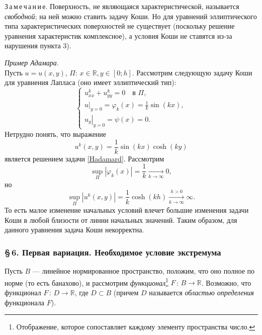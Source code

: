 \documentclass[12pt,a5paper]{book}
\begin{document}
	\noindent З\,а\,м\,е\,ч\,а\,н\,и\,е. Поверхность, не являющаяся характеристической, называется \emph{свободной}; на ней можно ставить задачу Коши. Но для уравнений эллиптического типа характеристических поверхностей не существует (поскольку решение уравнения характеристик комплексное), а условия Коши не ставятся из-за нарушения пункта 3).
	
	\vspace*{1em}
	\emph{Пример Адамара.}\\
	\noindent Пусть $u = u(x,y)$, $\Pi$: $x \in \mathbb{R}, y \in [0; h]$. Рассмотрим следующую задачу Коши для уравнения Лапласа (оно имеет эллиптический тип):
	\begin{equation}\label{Hadamard}
		\begin{cases}
			u^k_{xx} + u^k_{yy} = 0 \quad \text{в }\Pi, \\
			\left.u\right|_{y=0} = \varphi_k(x) = \frac{1}{k}\sin{(kx)}, \\ \left.u_y\right|_{y=0} = \psi(x) = 0.
		\end{cases}
	\end{equation}
	Нетрудно понять, что выражение
	\begin{equation*}
		u^k(x,y) = \frac{1}{k}\sin{(kx)}\cosh{(ky)}
	\end{equation*}
	является решением задачи \eqref{Hadamard}. Рассмотрим
	\begin{equation*}
		\sup_{\Pi}\left|\varphi_k(x)\right| = \frac{1}{k} \xrightarrow[k\rightarrow\infty]{} 0,
	\end{equation*}
	но
	\begin{equation*}
		\sup_{\Pi}\left|u^k(x,y)\right| = \frac{1}{k}\cosh{(kh)} \xrightarrow[k\rightarrow\infty]{h>0} \infty.
	\end{equation*}
	То есть малое изменение начальных условий влечет большие изменения задачи Коши в любой близости от линии начальных значений. Таким образом, для данного уравнения задача Коши некорректна.
	
	\subsubsection*{\S\,6. Первая вариация. Необходимое условие экстремума}
	
	Пусть $B$ --- линейное нормированное пространство, положим, что оно полное по норме (то есть банахово), и рассмотрим \emph{функционал}\footnote{Отображение, которое сопоставляет каждому элементу пространства число.} $F$\,: $B \rightarrow \mathbb{R}$. Возможно, что функционал $F$\,: $D \rightarrow \mathbb{R}$, где $D \subset B$ (причем $D$ называется \emph{областью определения} функционала $F$).
	
\end{document}
